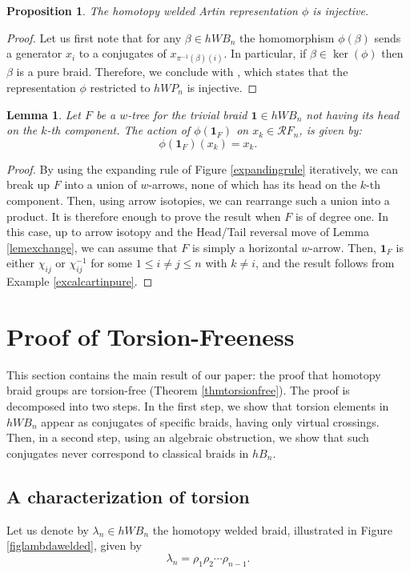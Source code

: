 \documentclass[11pt, a4paper, twoside,reqno]{amsart}
\theoremstyle{plain}
\newtheorem{lem}[thm]{Lemma}
\newtheorem{prop}[thm]{Proposition}
\theoremstyle{definition}
\theoremstyle{remark}
\begin{document}
\begin{prop}\label{propartininj}
The homotopy welded Artin representation $\phi$ is injective.
\end{prop}
\begin{proof}
Let us first note that for any $\beta\in hWB_n$ the homomorphism $\phi(\beta)$ sends a generator $x_i$ to a conjugates of $x_{\pi^{-1}(\beta)(i)}$. In particular, if $\beta\in\ker(\phi)$ then $\beta$ is a pure braid. Therefore, we conclude with \cite[Thm. 2.34]{ABMWhomotopyribbontube}, which states that the representation $\phi$ restricted to $hWP_n$ is injective.
\end{proof}

\begin{lem}\label{lemsondagewelded}
Let $F$ be a $w$-tree for the trivial braid $\mathbf{1}\in hWB_n$ not having its head on the $k$-th component. The action of $\phi(\mathbf1_F)$ on $x_k \in \mathcal{R}F_n$, is given by: $$\phi(\mathbf1_{F})(x_k)=x_k.$$
\end{lem}
\begin{proof}
By using the expanding rule of Figure \ref{expandingrule} iteratively, we can break up $F$ into a union of $w$-arrows, none of which has its head on the $k$-th component. Then, using arrow isotopies, we can rearrange such a union into a product. It is therefore enough to prove the result when $F$ is of degree one. In this case, up to arrow isotopy and the Head/Tail reversal move of Lemma \ref{lemexchange}, we can assume that $F$ is simply a horizontal $w$-arrow. Then, $\mathbf1_F$ is either $\chi_{ij}$ or $\chi_{ij}^{-1}$ for some $1 \leq i \neq j \leq n$ with $k \neq i$, and the result follows from Example \ref{excalcartinpure}.
\end{proof}

\section{Proof of Torsion-Freeness}\label{sectiontorsion}

This section contains the main result of our paper: the proof that homotopy braid groups are torsion-free (Theorem \ref{thmtorsionfree}). The proof is decomposed into two steps. In the first step, we show that torsion elements in $hWB_n$ appear as conjugates of specific braids, having only virtual crossings. Then, in a second step, using an algebraic obstruction, we show that such conjugates never correspond to classical braids in $hB_n$.

\subsection{A characterization of torsion}
Let us denote by $\lambda_n\in hWB_n$ the homotopy welded braid, illustrated in Figure \ref{figlambdawelded}, given by
\[\lambda_n=\rho_1\rho_2\cdots\rho_{n-1}.\]
\end{document}
